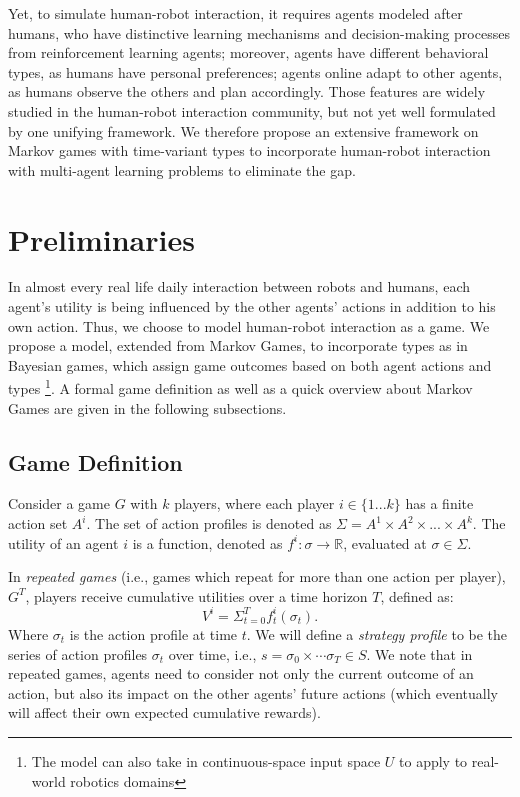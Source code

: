 \documentclass[letterpaper, 10 pt, conference]{ieeeconf}  %
\begin{document}
Yet, to simulate human-robot interaction, it requires agents modeled after 
humans, who have distinctive learning mechanisms and decision-making processes 
from reinforcement learning agents; moreover, agents have different behavioral 
types, as humans have personal preferences; agents online adapt to other 
agents, as humans observe the others and plan accordingly. Those features are 
widely studied in the human-robot interaction community, but not yet well 
formulated by one unifying framework. We therefore propose 
an extensive framework on Markov games with time-variant types to incorporate 
human-robot interaction with multi-agent learning problems to eliminate the gap. 



\section{Preliminaries}
In almost every real life daily interaction between robots and humans, each agent's utility  is being influenced by the other agents' actions in addition to his own action. Thus, we choose to model human-robot interaction as a game. We propose a model, extended from Markov Games, to incorporate types as in Bayesian games, which assign game outcomes based on both agent actions and types \footnote{The model can also take in continuous-space input space $U$ to apply to real-world robotics domains}. A formal game definition as well as a quick overview about Markov Games are given in the following subsections.  
\subsection{Game Definition}
Consider a game $G$ with $k$ players, where each player $i \in \{1...k\}$ has 
a finite action set $A^i$. The set of action profiles is denoted as 
$\Sigma = A^1 \times A^2 \times ... \times A^k$. The utility of an 
agent $i$ is a function, denoted as $f^i: \sigma \rightarrow \mathbb{R} $, 
evaluated at $\sigma \in \Sigma$. 

In \textit{repeated games} (i.e., games which repeat for more than one action per player), $G^T$, players receive cumulative utilities over a 
time horizon $T$, defined as:
\begin{equation}
	V^i=\Sigma_{t=0}^{T} f^i_t(\sigma_t).
\end{equation}
Where $\sigma_t$ is the action profile at time $t$.
We will define a \textit{strategy profile} to be the series of action profiles $\sigma_t$ over time, i.e., $s = \sigma_0 \times \cdots \sigma_T \in S$. We note that in repeated games, agents need to consider not only the current outcome of an action, but also its impact on the other agents' future actions (which eventually will affect their own expected cumulative rewards).
\end{document}
